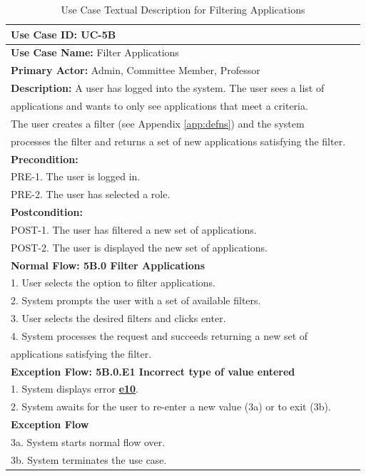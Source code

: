 \documentclass[fontsize=12pt,paper=letter,twoside]{scrartcl}
\begin{document}
\begin{table}[!htb]
\begin{center}
\begin{tabular}{|l|l|}
\hline
\textbf{Use Case ID:} UC-5B \\ \hline
\textbf{Use Case Name:} Filter Applications \\ \hline
\textbf {Primary Actor:} Admin, Committee Member, Professor \\ \hline
\textbf{Description:} A user has logged into the system. The user sees a list of \\ applications and wants to only see applications that meet a criteria. \\The user creates a filter (see Appendix \ref{app:defns}) and the system \\processes the filter and returns a set of new applications satisfying the filter.\\ \hline
\textbf{Precondition:}
\\ PRE-1. The user is logged in.
\\ PRE-2. The user has selected a role. \\ \hline
\textbf{Postcondition:}
\\ POST-1. The user has filtered a new set of applications.
\\ POST-2. The user is displayed the new set of applications. \\ \hline
\textbf{Normal Flow: 5B.0 Filter Applications}
\\ 1. User selects the option to filter applications.
\\ 2. System prompts the user with a set of available filters.
\\ 3. User selects the desired filters and clicks enter.
\\ 4. System processes the request and succeeds returning a new set of \\applications satisfying the filter.\\ \hline
\textbf{Exception Flow: 5B.0.E1 Incorrect type of value entered}
\\ 1. System displays error \hyperref[app:error]{\textbf{e10}}.
\\ 2. System awaits for the user to re-enter a new value (3a) or to exit (3b). \\ \hline
\textbf{Exception Flow}
\\ 3a. System starts normal flow over.
\\ 3b. System terminates the use case.\\ \hline 
\end{tabular}
\end{center}
\caption {Use Case Textual Description for Filtering Applications}
\label{tbl:uc5Btd}
\end{table}
\end{document}
